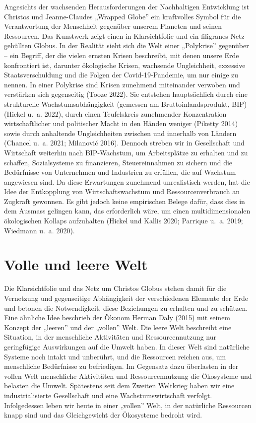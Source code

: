 \documentclass[
  nswissgerman,
  a4paper,
  openany]{book}
\begin{document}
Angesichts der wachsenden Herausforderungen der Nachhaltigen Entwicklung
ist Christos und Jeanne-Claudes „Wrapped Globe'' ein kraftvolles Symbol
für die Verantwortung der Menschheit gegenüber unserem Planeten und
seinen Ressourcen. Das Kunstwerk zeigt einen in Klarsichtfolie und ein
filigranes Netz gehüllten Globus. In der Realität sieht sich die Welt
einer „Polykrise'' gegenüber -- ein Begriff, der die vielen ernsten
Krisen beschreibt, mit denen unsere Erde konfrontiert ist, darunter
ökologische Krisen, wachsende Ungleichheit, exzessive Staatsverschuldung
und die Folgen der Covid-19-Pandemie, um nur einige zu nennen. In einer
Polykrise sind Krisen zunehmend miteinander verwoben und verstärken sich
gegenseitig (Tooze 2022). Sie entstehen hauptsächlich durch eine
strukturelle Wachstumsabhängigkeit (gemessen am Bruttoinlandsprodukt,
BIP) (Hickel u.~a. 2022), durch einen Teufelskreis zunehmender
Konzentration wirtschaftlicher und politischer Macht in den Händen
weniger (Piketty 2014) sowie durch anhaltende Ungleichheiten zwischen
und innerhalb von Ländern (Chancel u.~a. 2021; Milanović 2016). Dennoch
streben wir in Gesellschaft und Wirtschaft weiterhin nach BIP-Wachstum,
um Arbeitsplätze zu erhalten und zu schaffen, Sozialsysteme zu
finanzieren, Steuereinnahmen zu sichern und die Bedürfnisse von
Unternehmen und Industrien zu erfüllen, die auf Wachstum angewiesen
sind. Da diese Erwartungen zunehmend unrealistisch werden, hat die Idee
der Entkopplung von Wirtschaftswachstum und Ressourcenverbrauch an
Zugkraft gewonnen. Es gibt jedoch keine empirischen Belege dafür, dass
dies in dem Ausmass gelingen kann, das erforderlich wäre, um einen
multidimensionalen ökologischen Kollaps aufzuhalten (Hickel und Kallis
2020; Parrique u.~a. 2019; Wiedmann u.~a. 2020).

\section*{Volle und leere Welt}\label{volle-und-leere-welt}


Die Klarsichtfolie und das Netz um Christos Globus stehen damit für die
Vernetzung und gegenseitige Abhängigkeit der verschiedenen Elemente der
Erde und betonen die Notwendigkeit, diese Beziehungen zu erhalten und zu
schützen. Eine ähnliche Idee beschrieb der Ökonom Herman Daly (2015) mit
seinem Konzept der „leeren'' und der „vollen'' Welt. Die leere Welt
beschreibt eine Situation, in der menschliche Aktivitäten und
Ressourcennutzung nur geringfügige Auswirkungen auf die Umwelt haben. In
dieser Welt sind natürliche Systeme noch intakt und unberührt, und die
Ressourcen reichen aus, um menschliche Bedürfnisse zu befriedigen. Im
Gegensatz dazu überlasten in der vollen Welt menschliche Aktivitäten und
Ressourcennutzung die Ökosysteme und belasten die Umwelt. Spätestens
seit dem Zweiten Weltkrieg haben wir eine industrialisierte Gesellschaft
und eine Wachstumswirtschaft verfolgt. Infolgedessen leben wir heute in
einer „vollen'' Welt, in der natürliche Ressourcen knapp sind und das
Gleichgewicht der Ökosysteme bedroht wird.
\end{document}
